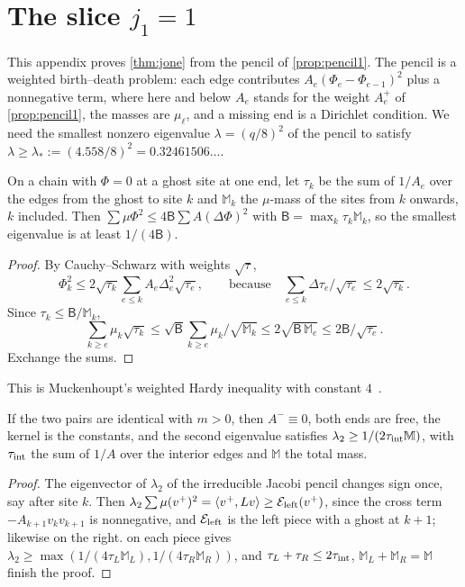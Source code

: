 \section{The slice \texorpdfstring{$j_1=1$}{j1 = 1}}\label{app:jone}

This appendix proves \cref{thm:jone} from the pencil of \cref{prop:pencil1}. The pencil is
a weighted birth--death problem: each edge contributes $A_e(\Phi_e-\Phi_{e-1})^2$ plus a
nonnegative term, where here and below $A_e$ stands for the weight $A^+_e$ of
\cref{prop:pencil1}, the masses are $\mu_\ell$, and a missing end is a Dirichlet condition.
We need the smallest nonzero eigenvalue $\lambda=(q/8)^2$ of the pencil to satisfy
$\lambda\ge\lambda_*:=(4.558/8)^2=0.32461506\ldots$.

\begin{lemma}\label{lem:hardy}
On a chain with $\Phi=0$ at a ghost site at one end, let $\tau_k$ be the sum of $1/A_e$ over
the edges from the ghost to site $k$ and $\mathbb M_k$ the $\mu$-mass of the sites from $k$
onwards, $k$ included. Then $\sum\mu\Phi^2\le4\mathsf B\sum A(\Delta\Phi)^2$ with
$\mathsf B=\max_k\tau_k\mathbb M_k$, so the smallest eigenvalue is at least $1/(4\mathsf B)$.
\end{lemma}

\begin{proof}
By Cauchy--Schwarz with weights $\sqrt{\tau}$,
\[
  \Phi_k^2\le2\sqrt{\tau_k}\sum_{e\le k}A_e\Delta_e^2\sqrt{\tau_e},\qquad\text{because}\quad
  \sum_{e\le k}\Delta\tau_e/\sqrt{\tau_e}\le2\sqrt{\tau_k}.
\]
Since $\tau_k\le\mathsf B/\mathbb M_k$,
\[
  \sum_{k\ge e}\mu_k\sqrt{\tau_k}\le\sqrt{\mathsf B}\sum_{k\ge e}\mu_k/\sqrt{\mathbb M_k}
  \le2\sqrt{\mathsf B\,\mathbb M_e}\le2\mathsf B/\sqrt{\tau_e}.
\]
Exchange the sums.
\end{proof}

This is Muckenhoupt's weighted Hardy inequality with constant $4$~\cite{Muckenhoupt1972}.

\begin{lemma}\label{lem:nodal}
If the two pairs are identical with $m>0$, then $A^-\equiv0$, both ends are free, the kernel
is the constants, and the second eigenvalue satisfies $\lambda_2\ge1/(2\tau_{\rm int}\mathbb M)$,
with $\tau_{\rm int}$ the sum of $1/A$ over the interior edges and $\mathbb M$ the total mass.
\end{lemma}

\begin{proof}
The eigenvector of $\lambda_2$ of the irreducible Jacobi pencil changes sign once, say
after site $k$. Then $\lambda_2\sum\mu(v^+)^2=\langle v^+,Lv\rangle\ge\mathcal E_{\rm left}(v^+)$,
since the cross term $-A_{k+1}v_kv_{k+1}$ is nonnegative, and $\mathcal E_{\rm left}$ is the left
piece with a ghost at $k+1$; likewise on the right.  on each piece gives
$\lambda_2\ge\max(1/(4\tau_L\mathbb M_L),1/(4\tau_R\mathbb M_R))$, and $\tau_L+\tau_R\le2\tau_{\rm int}$,
$\mathbb M_L+\mathbb M_R=\mathbb M$ finish the proof.
\end{proof}

